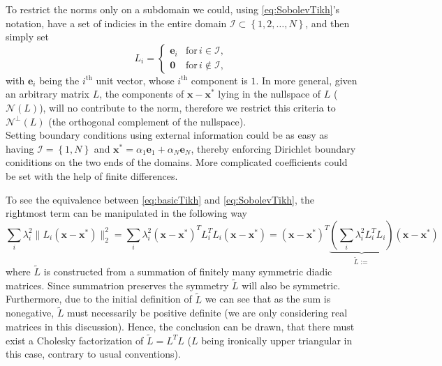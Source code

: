 \documentclass{article}
\newcommand{\mbf}[1]{\mathbf{#1}}
\begin{document}
	To restrict the norms only on a subdomain we could, using \autoref{eq:SobolevTikh}'s notation, have a set of indicies in the entire domain $\mathcal{I}\subset \left\{1,2,\dots, N\right\}$, and then simply set 
	\begin{equation}
		L_i = \begin{cases}
			\textbf{e}_i &\mathrm{for} \, i\in \mathcal{I},\\
			\textbf{0} &\mathrm{for} \, i\notin \mathcal{I},
		\end{cases}
	\end{equation}
	with $\textbf{e}_i$ being the $i^{\mathrm{th}}$ unit vector, whose $i^{\mathrm{th}}$ component is $1$.
	In more general, given an arbitrary matrix $L$, the components of $\textbf{x}- \textbf{x}^\ast$ lying in the nullspace of $L$ ($\mathcal{N}\left(L\right)$), will no contribute to the norm, therefore we restrict this criteria to $\mathcal{N}^\perp \left(L\right)$ (the orthogonal complement of the nullspace).\\
	
	Setting boundary conditions using external information could be as easy as having $\mathcal{I} = \left\lbrace 1, N\right\rbrace$ and $\textbf{x}^\ast = \alpha_1 \textbf{e}_1 + \alpha_N \textbf{e}_N$, thereby enforcing Dirichlet boundary coniditions on the two ends of the domains. More complicated coefficients could be set with the help of finite differences.
	
	
	To see the equivalence between \autoref{eq:basicTikh} and \autoref{eq:SobolevTikh}, the rightmost term can be manipulated in the following way
	\begin{equation}
		\sum_i\lambda^2_i \|L_i\left(\mbf{x} - \mbf{x}^{\ast} \right)\|_2^2 = \sum_i\lambda^2_i \left(\mbf{x} - \mbf{x}^{\ast} \right)^T L_i^T L_i\left(\mbf{x} - \mbf{x}^{\ast} \right) =  \left(\mbf{x} - \mbf{x}^{\ast} \right)^T \underbrace{\left( \sum_i\lambda^2_i L_i^T L_i \right)}_{\tilde{L}:=} \left(\mbf{x} - \mbf{x}^{\ast} \right)
	\end{equation}
	where $\tilde{L}$ is constructed from a summation of finitely many symmetric diadic matrices. Since summatrion preserves the symmetry $\tilde{L}$ will also be symmetric. Furthermore, due to the initial definition of $\tilde{L}$ we can see that as the sum is nonegative, $\tilde{L}$ must necessarily be positive definite (we are only considering real matrices in this discussion). Hence, the conclusion can be drawn, that there must exist a Cholesky factorization of $\tilde{L} = L^T L$ ($L$ being ironically upper triangular in this case, contrary to usual conventions).
	
\end{document}
